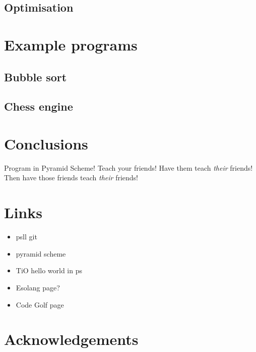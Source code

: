 \documentclass[aip,jcp,reprint]{revtex4-1}
\begin{document}
\subsection{Optimisation}

\section{Example programs}
\subsection{Bubble sort}
\subsection{Chess engine}

\section{Conclusions}
Program in Pyramid Scheme! Teach your friends! Have them teach \emph{their} friends! Then have those friends teach \emph{their} friends!


\lipsum[11-15]

\section*{Links}
\begin{itemize}
\item psll git
\item pyramid scheme
\item TiO hello world in ps
\item Esolang page?
\item Code Golf page
\end{itemize}

\section*{Acknowledgements}


\end{document}
